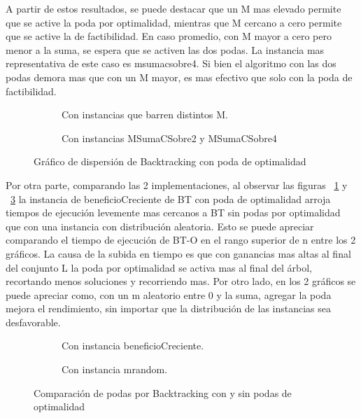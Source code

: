 \documentclass[10pt,a4paper]{article}
\begin{document}
A partir de estos resultados, se puede destacar que un M mas elevado permite que se active la poda por optimalidad, mientras que M cercano a cero permite que se active la de factibilidad. En caso promedio, con M mayor a cero pero menor a la suma, se espera que se activen las dos podas. La instancia mas representativa de este caso es msumacsobre4. Si bien el algoritmo con las dos podas demora mas que con un M mayor, es mas efectivo que solo con la poda de factibilidad. 

\begin{figure}[H]
    \centering
    \begin{subfigure}{0.45\linewidth}
        \centering
        
        \caption{Con instancias que barren distintos M.}
        \label{fig:bt-o-varios-casos}
    \end{subfigure}
    \begin{subfigure}{0.45\linewidth}
        \centering
        
        \caption{Con instancias MSumaCSobre2 y MSumaCSobre4}
        \label{fig:bt-o-suma2-suma4-random}
    \end{subfigure}
    \caption{Gráfico de dispersión de Backtracking con poda de optimalidad}
\end{figure}

Por otra parte, comparando las 2 implementaciones, al observar las figuras ~\ref{fig:bt-o-varios-casos} y ~\ref{fig:bt-o-suma2-suma4-random} la instancia de beneficioCreciente de BT con poda de optimalidad arroja tiempos de ejecución levemente mas cercanos a BT sin podas por optimalidad que con una instancia con distribución aleatoria. Esto se puede apreciar comparando el tiempo de ejecución de BT-O en el rango superior de n entre los 2 gráficos. La causa de la subida en tiempo es que con ganancias mas altas al final del conjunto L la poda por optimalidad se activa mas al final del árbol, recortando menos soluciones y recorriendo mas. Por otro lado, en los 2 gráficos se puede apreciar como, con un m aleatorio entre 0 y la suma, agregar la poda mejora el rendimiento, sin importar que la distribución de las instancias sea desfavorable. 

\begin{figure}[H]
    \centering
    \begin{subfigure}{0.49\linewidth}
        \centering
        
        \caption{Con instancia beneficioCreciente.}
        \label{fig:bt-comparacion-podas-beneficio-creciente}
    \end{subfigure}
    \begin{subfigure}{0.49\linewidth}
        \centering
        
        \caption{Con instancia mrandom.}
        \label{fig:bt-comparacion-podas-mrandom}
    \end{subfigure}
    \caption{Comparación de podas por Backtracking con y sin podas de optimalidad}
\end{figure}    
\end{document}
